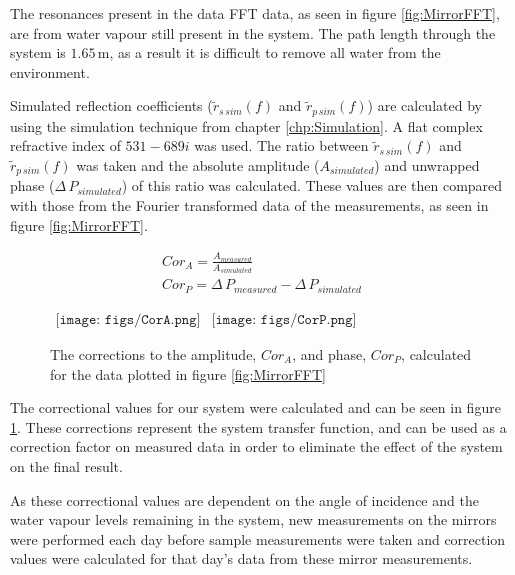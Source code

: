 The resonances present in the data FFT data, as seen in figure \ref{fig:MirrorFFT}, are from water vapour still present in the system. The path length through the system is $1.65\,$m, as a result it is difficult to remove all water from the environment.

Simulated reflection coefficients ($\widetilde{r}_{s\, sim}(f)$ and $\widetilde{r}_{p\,sim}(f)$) are calculated by using the simulation technique from chapter \ref{chp:Simulation}. A flat complex refractive index of $531 - 689i$ was used. The ratio between $\widetilde{r}_{s\, sim}(f)$ and $\widetilde{r}_{p\, sim}(f)$ was taken and the absolute amplitude ($A_{simulated}$) and unwrapped phase ($\Delta\,P_{simulated}$) of this ratio was calculated. These values are then compared with those from the Fourier transformed data of the measurements, as seen in figure \ref{fig:MirrorFFT}.

\begin{eqnarray}
Cor_{A} = \frac{A_{measured}}{A_{simulated}}\\
Cor_{P} = \Delta\,P_{measured} - \Delta\,P_{simulated}
\label{eq:MirCor}
\end{eqnarray}

\begin{figure}[H]
                \begin{center}$
								\begin{array}{cc}
                \texttt{[image: figs/CorA.png]}&
                \texttt{[image: figs/CorP.png]}
								\end{array}$
								\end{center}
	\caption[Amplitude and phase correction factors]{The corrections to the amplitude, $Cor_A$, and phase, $Cor_P$, calculated for the data plotted in figure \ref{fig:MirrorFFT}}
	\label{fig:MirrorCor}
\end{figure}

The correctional values for our system were calculated and can be seen in figure \ref{fig:MirrorCor}. These corrections represent the system transfer function, and can be used as a correction factor on measured data in order to eliminate the effect of the system on the final result.

As these correctional values are dependent on the angle of incidence and the water vapour levels remaining in the system, new measurements on the mirrors were performed each day before sample measurements were taken and correction values were calculated for that day's data from these mirror measurements.


